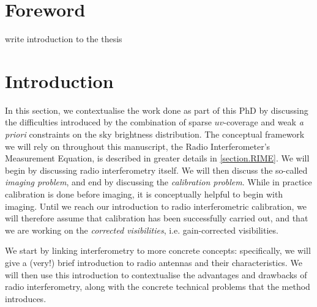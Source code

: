 \chapter{Foreword}
\pg
write introduction to the thesis

\chapter{Introduction}
\minitoc

\pg
In this section, we contextualise the work done as part of this PhD by discussing the difficulties introduced by the combination of sparse $uv$-coverage and weak \emph{a priori} constraints on the sky brightness distribution. The conceptual framework we will rely on throughout this manuscript, the Radio Interferometer's Measurement Equation, is described in greater details in  \cref{section.RIME}. We will begin by discussing radio interferometry itself. We will then discuss the so-called \emph{imaging problem}, and end by discussing the \emph{calibration problem}. While in practice calibration is done before imaging, it is conceptually helpful to begin with imaging. Until we reach our introduction to radio interferometric calibration, we will therefore assume that calibration has been successfully carried out, and that we are working on the \emph{corrected visibilities}, i.e. gain-corrected visibilities. 

\pg
We start by linking interferometry to more concrete concepts: specifically, we will give a (very!) brief introduction to radio antennas and their characteristics. We will then use this introduction to contextualise the advantages and drawbacks of radio interferometry, along with the concrete technical problems that the method introduces.


\clearpage

\clearpage

\clearpage

\clearpage
